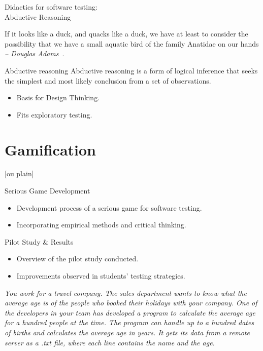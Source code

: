 \documentclass[aspectratio=169]{beamer}
\begin{document}
\begin{frame}{Didactics for software testing: \\Abductive Reasoning}
    \begin{blockquote}
    If it looks like a duck, and quacks like a duck, we have at least to consider the possibility that we have a small aquatic bird of the family Anatidae on our hands\\
    \textit{-- Douglas Adams}~\cite{adams1987dirk}.
    \end{blockquote}
\end{frame}

\begin{frame}{Abductive reasoning}
    Abductive reasoning is a form of logical inference that seeks the simplest and most likely conclusion from a set of observations.~\cite{ContributorstoWikimediaprojects2024Feb} 
    \begin{itemize}
        \item Basis for Design Thinking.
        \item Fits exploratory testing.
    \end{itemize}
\end{frame}

\section{Gamification}

[ou plain]
\begin{frame}{Serious Game Development}
    \begin{itemize}
        \item Development process of a serious game for software testing.
        \item Incorporating empirical methods and critical thinking.
    \end{itemize}
\end{frame}

\begin{frame}{Pilot Study \& Results}
    \begin{itemize}
        \item Overview of the pilot study conducted.
        \item Improvements observed in students' testing strategies.
    \end{itemize}
    \textit{You work for a travel company. 
The sales department wants to know what the average age is of the people who booked their holidays with your company. One of the developers in your team has developed a program to calculate the average age for a hundred people at the time. The program can handle up to a hundred dates of births and calculates the average age in years. It gets its data from a remote server as a .txt file, where each line contains the name and the age.
}
\end{frame}
\end{document}
